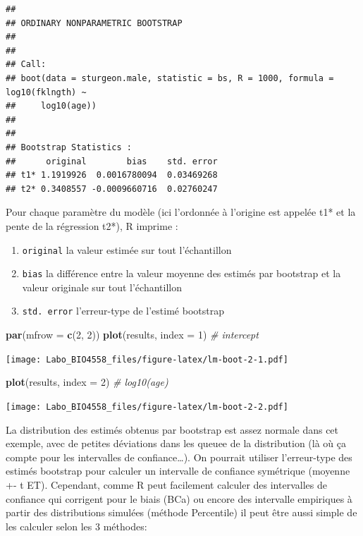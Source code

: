 \documentclass[
  12pt,
]{book}
\newenvironment{Shaded}{\begin{snugshade}}{\end{snugshade}}
\newcommand{\CommentTok}[1]{\textcolor[rgb]{0.56,0.35,0.01}{\textit{#1}}}
\newcommand{\DataTypeTok}[1]{\textcolor[rgb]{0.13,0.29,0.53}{#1}}
\newcommand{\DecValTok}[1]{\textcolor[rgb]{0.00,0.00,0.81}{#1}}
\newcommand{\KeywordTok}[1]{\textcolor[rgb]{0.13,0.29,0.53}{\textbf{#1}}}
\newcommand{\NormalTok}[1]{#1}
\providecommand{\tightlist}{%
  \setlength{\itemsep}{0pt}\setlength{\parskip}{0pt}}
\begin{document}
\begin{verbatim}
## 
## ORDINARY NONPARAMETRIC BOOTSTRAP
## 
## 
## Call:
## boot(data = sturgeon.male, statistic = bs, R = 1000, formula = log10(fklngth) ~ 
##     log10(age))
## 
## 
## Bootstrap Statistics :
##      original        bias    std. error
## t1* 1.1919926  0.0016780094  0.03469268
## t2* 0.3408557 -0.0009660716  0.02760247
\end{verbatim}

Pour chaque paramètre du modèle (ici l'ordonnée à l'origine est
appelée t1* et la pente de la régression t2*), R imprime :

\begin{enumerate}
\def\labelenumi{\arabic{enumi}.}
\tightlist
\item
  \texttt{original} la valeur estimée sur tout l'échantillon
\item
  \texttt{bias} la différence entre la valeur moyenne des estimés par bootstrap et la valeur originale sur tout l'échantillon
\item
  \texttt{std.\ error} l'erreur-type de l'estimé bootstrap
\end{enumerate}

\begin{Shaded}
\begin{Highlighting}[]
\KeywordTok{par}\NormalTok{(}\DataTypeTok{mfrow =} \KeywordTok{c}\NormalTok{(}\DecValTok{2}\NormalTok{, }\DecValTok{2}\NormalTok{))}
\KeywordTok{plot}\NormalTok{(results, }\DataTypeTok{index =} \DecValTok{1}\NormalTok{) }\CommentTok{\# intercept}
\end{Highlighting}
\end{Shaded}

\texttt{[image: Labo\_BIO4558\_files/figure-latex/lm-boot-2-1.pdf]}

\begin{Shaded}
\begin{Highlighting}[]
\KeywordTok{plot}\NormalTok{(results, }\DataTypeTok{index =} \DecValTok{2}\NormalTok{) }\CommentTok{\# log10(age)}
\end{Highlighting}
\end{Shaded}

\texttt{[image: Labo\_BIO4558\_files/figure-latex/lm-boot-2-2.pdf]}

La distribution des estimés obtenus par bootstrap est assez normale dans cet exemple, avec de petites déviations dans les queuee de la distribution (là où ça compte pour les intervalles de confiance\ldots). On pourrait utiliser l'erreur-type des estimés bootstrap pour calculer un intervalle de confiance symétrique (moyenne +- t ET). Cependant, comme R peut facilement calculer des intervalles de confiance qui corrigent pour le biais (BCa) ou encore des intervalle empiriques à partir des distributions simulées (méthode Percentile) il peut être aussi simple de les calculer selon les 3 méthodes:
\end{document}
